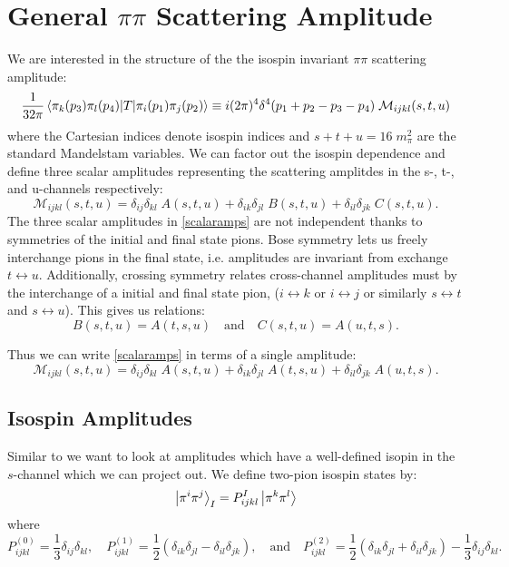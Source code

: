 \documentclass[aps,prd,amsmath,amssymb,superscriptaddress,onecolumn,
nofootinbib,showpacs,preprintnumbers]{revtex4-1}
\newcommand{\pp}{\pi\pi }
\begin{document}
\section{General $\pp$ Scattering Amplitude}
We are interested in the structure of the the isospin invariant $\pp$ scattering amplitude:
%
	\begin{equation}
	\frac{1}{32\pi}\mel{\pi_k(p_3)\pi_l(p_4)}{T}{\pi_i(p_1)\pi_j(p_2)} \equiv i (2 \pi)^4 \delta^4(p_1 + p_2 - p_3 - p_4) \;  \mathcal{M}_{ijkl}(s,t,u) 
	\end{equation}
%
where the Cartesian indices denote isospin indices and $s + t + u = 16 \; m_\pi^2$ are the standard Mandelstam variables.
We can factor out the isospin dependence and define three scalar amplitudes representing the scattering amplitdes in the s-, t-, and u-channels respectively:
%
	\begin{equation} \label{scalaramps}
	\mathcal{M}_{ijkl}(s,t,u) = \delta_{ij}\delta_{kl} \; A(s,t,u) + \delta_{ik}\delta_{jl} \; B(s,t,u) + \delta_{il}\delta_{jk} \; C(s,t,u).
	\end{equation}
%
The three scalar amplitudes in \cref{scalaramps} are not independent thanks to symmetries of the initial and final state pions. Bose symmetry lets us freely interchange pions in the final state, i.e. amplitudes are invariant from exchange $t \leftrightarrow u$. Additionally, crossing symmetry relates cross-channel amplitudes must by the interchange of a initial and final state pion, ($i\leftrightarrow k$ or $i \leftrightarrow j$ or similarly $s \leftrightarrow t$ and $s \leftrightarrow u$). This gives us relations:
%
	\begin{equation} \label{symmetries}
	 B(s,t,u) = A(t,s,u) \quad \textrm{and} \quad C(s,t,u) = A(u,t,s). 
	\end{equation}
%

Thus we can write \cref{scalaramps} in terms of a single amplitude:
%
	\begin{equation}\label{matrixelement}
	\mathcal{M}_{ijkl}(s,t,u) =  \delta_{ij}\delta_{kl} \; A(s, t,u) + \delta_{ik}\delta_{jl} \; A(t, s, u) + \delta_{il}\delta_{jk} \; A(u, t,s).
	\end{equation}
	\subsection{Isospin Amplitudes}

Similar to \cite{JPACCollaboration2018} we want to look at amplitudes which have a well-defined isopin in the $s$-channel which we can project out. We define two-pion isospin states by:
%
	\begin{equation} \label{isospin}
	\ket{\pi^i \pi^j}_I = P^{I}_{ijkl} \ket{\pi^k \pi^l}
	\end{equation}
%
where 
%
	\begin{equation} \label{projectors}
	P^{(0)}_{ijkl} = \frac{1}{3}\delta_{ij}\delta_{kl},  \quad P^{(1)}_{ijkl} = \frac{1}{2}(\delta_{ik}\delta_{jl}-\delta_{il}\delta_{jk}),  \quad \textrm{and} \quad   P^{(2)}_{ijkl} = \frac{1}{2}
	(\delta_{ik}\delta_{jl} + \delta_{il}\delta_{jk}) - \frac{1}{3} \delta_{ij}\delta_{kl}.
	\end{equation}
%
\end{document}
